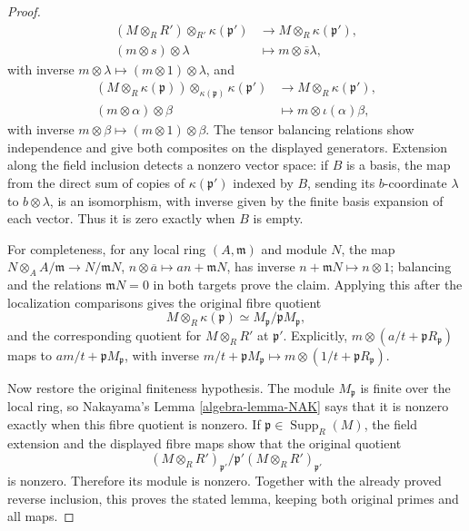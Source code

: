 \begin{proof}
\[\begin{split}
(M\otimes_RR')\otimes_{R'}\kappa(\mathfrak p')
&\longrightarrow M\otimes_R\kappa(\mathfrak p'),\\
(m\otimes s)\otimes\lambda
&\longmapsto m\otimes\overline s\lambda,
\end{split}

\]
with inverse $m\otimes\lambda\mapsto(m\otimes1)\otimes\lambda$,
and
\[

\begin{split}
(M\otimes_R\kappa(\mathfrak p))
\otimes_{\kappa(\mathfrak p)}\kappa(\mathfrak p')
&\longrightarrow M\otimes_R\kappa(\mathfrak p'),\\
(m\otimes\alpha)\otimes\beta
&\longmapsto m\otimes\iota(\alpha)\beta,
\end{split}

\]
with inverse $m\otimes\beta\mapsto(m\otimes1)\otimes\beta$.
The tensor balancing relations show independence and give
both composites on the displayed generators. Extension
along the field inclusion detects a nonzero vector space:
if $B$ is a basis, the map from the direct sum of copies
of $\kappa(\mathfrak p')$ indexed by $B$, sending its
$b$-coordinate $\lambda$ to $b\otimes\lambda$, is an
isomorphism, with inverse given by the finite basis
expansion of each vector. Thus it is zero exactly when
$B$ is empty.

For completeness, for any local ring $(A,\mathfrak m)$
and module $N$, the map
$N\otimes_A A/\mathfrak m\to N/\mathfrak mN$,
$n\otimes\overline a\mapsto an+\mathfrak mN$, has inverse
$n+\mathfrak mN\mapsto n\otimes1$; balancing and the
relations $\mathfrak mN=0$ in both targets prove the claim.
Applying this after the localization comparisons gives the
original fibre quotient
$$
M\otimes_R\kappa(\mathfrak p)
\simeq M_{\mathfrak p}/\mathfrak pM_{\mathfrak p},
$$
and the corresponding quotient for $M\otimes_RR'$ at
$\mathfrak p'$. Explicitly,
$m\otimes(a/t+\mathfrak pR_{\mathfrak p})$ maps to
$am/t+\mathfrak pM_{\mathfrak p}$, with inverse
$m/t+\mathfrak pM_{\mathfrak p}\mapsto
m\otimes(1/t+\mathfrak pR_{\mathfrak p})$.

Now restore the original finiteness hypothesis. The module
$M_{\mathfrak p}$ is finite over the local ring, so
Nakayama's Lemma \ref{algebra-lemma-NAK} says that it is nonzero
exactly when this fibre quotient is nonzero. If
$\mathfrak p\in\operatorname{Supp}_R(M)$, the field
extension and the displayed fibre maps show that the
original quotient
$$
(M\otimes_RR')_{\mathfrak p'}/
\mathfrak p'(M\otimes_RR')_{\mathfrak p'}
$$
is nonzero. Therefore its module is nonzero. Together
with the already proved reverse inclusion, this proves
the stated lemma, keeping both original primes and all maps.


\end{proof}
